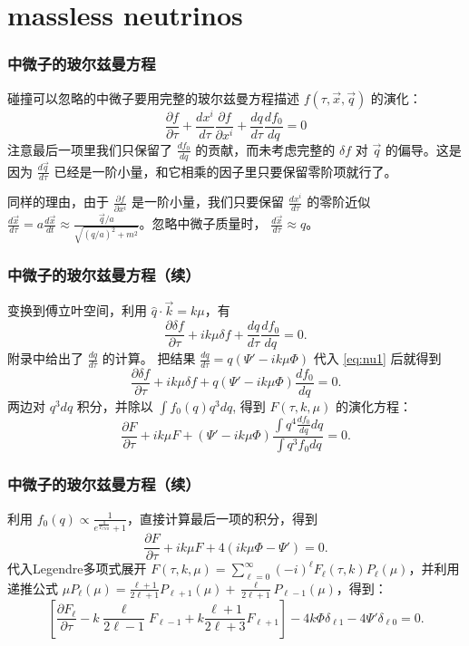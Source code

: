 \documentclass[CJK,13pt]{beamer}
\begin{document}
    \section{massless neutrinos}

    
    \begin{frame}
      \frametitle{中微子的玻尔兹曼方程}
      碰撞可以忽略的中微子要用完整的玻尔兹曼方程描述 $f(\tau, \vec{x}, \vec{q})$ 的演化：
      $$\frac{\partial f}{\partial \tau} + \frac{dx^i}{d\tau}\frac{\partial f}{\partial x^i} + \frac{d q}{d\tau} \frac{d f_0}{d q} = 0$$
      注意最后一项里我们只保留了 $\frac{d f_0}{d q}$ 的贡献，而未考虑完整的 $\delta f$ 对 $\vec{q}$ 的偏导。这是因为 $\frac{d\vec{q}}{d\tau}$ 已经是一阶小量，和它相乘的因子里只要保留零阶项就行了。

      同样的理由，由于 $\frac{\partial f}{\partial x^i}$ 是一阶小量，我们只要保留 $\frac{dx^i}{d\tau}$ 的零阶近似 $\frac{d\vec{x}}{d\tau} = a \frac{d\vec{x}}{dt} \approx \frac{\vec{q}/a}{\sqrt{(q/a)^2+m^2}}$。忽略中微子质量时， $\frac{d\vec{x}}{d\tau}\approx \hat{q}$。

    \end{frame}

    \begin{frame}
      \frametitle{中微子的玻尔兹曼方程（续）}
      变换到傅立叶空间，利用 $\hat{q}\cdot\vec{k} = k\mu $，有
      \begin{equation}
        \frac{\partial \delta f}{\partial \tau} + ik\mu \delta f + \frac{d q}{d\tau} \frac{d f_0}{d q} = 0. \label{eq:nu1}
      \end{equation}
      附录中给出了 $\frac{dq}{d\tau}$ 的计算。 把结果 $\frac{dq}{d\tau} = q\left(\Psi'-ik\mu\Phi\right)$ 代入 \eqref{eq:nu1} 后就得到
      $$\frac{\partial \delta f}{\partial \tau} + ik\mu \delta f +  q\left(\Psi'-ik\mu\Phi\right) \frac{d f_0}{d q} = 0.$$      
      两边对 $q^3dq$ 积分，并除以  $\int f_0(q)q^3dq$, 得到 $F(\tau, k, \mu)$ 的演化方程：
      $$\frac{\partial F}{\partial \tau} + ik\mu F + \left(\Psi'-ik\mu\Phi\right) \frac{\int q^4\frac{d f_0}{d q}dq}{\int q^3f_0dq} = 0.$$      
    \end{frame}


    \begin{frame}
      \frametitle{中微子的玻尔兹曼方程（续）}
      利用 $f_0(q) \propto \frac{1}{e^{\frac{q}{T_{CNB}}}+1}$，直接计算最后一项的积分，得到
       $$\frac{\partial F}{\partial \tau} + ik\mu F + 4\left(ik\mu\Phi-\Psi'\right) = 0.$$
      代入Legendre多项式展开 $ F(\tau,k,\mu) =  \sum_{\ell=0}^\infty (-i)^\ell F_\ell(\tau, k) P_\ell(\mu) $，并利用递推公式
      $\mu P_\ell(\mu) = \frac{\ell+1}{2\ell+1}P_{\ell +1}(\mu) + \frac{\ell}{2\ell+1}P_{\ell-1}(\mu)$，得到：
      $$ \left[\frac{\partial F_\ell}{\partial \tau} - k\frac{\ell}{2\ell-1} F_{\ell-1} + k \frac{\ell+1}{2\ell+3} F_{\ell+1}\right]   -  4 k\Phi \delta_{\ell 1} -4\Psi'\delta_{\ell 0} = 0.$$

    \end{frame}
\end{document}
